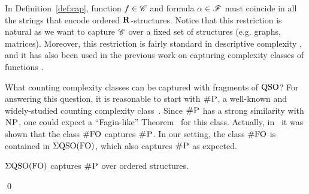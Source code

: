 In Definition~\ref{def:cap}, function $f \in \mathscr{C}$ and formula $\alpha \in \mathscr{F}$ must coincide in all the strings that encode ordered $\mathbf{R}$-structures. Notice that this restriction is natural as we want to capture %
$\mathscr{C}$ over a fixed set of structures (e.g. graphs, matrices).
Moreover, this restriction is fairly standard in descriptive complexity \cite{immerman1999descriptive,L04}, and it has also been used in the previous work on capturing complexity classes of functions \cite{SalujaST95,ComptonG96}.

What counting complexity classes can be captured with fragments of ${\rm QSO}$?
For answering this question, it is reasonable to start with $\text{\sc \#P}$, a well-known and widely-studied counting complexity class~\cite{arora2009computational}. 
Since $\text{\sc \#P}$ has a strong similarity with $\text{\sc NP}$, one could expect a ``Fagin-like'' Theorem~\cite{F75} for this class. 
Actually, in~\cite{SalujaST95} it was shown that the class $\#{\rm FO}$ captures $\text{\sc \#P}$.
In our setting, the class $\#{\rm FO}$ is contained in $\Sigma{\rm QSO}({\rm FO})$, which also captures $\text{\sc \#P}$ as expected.
 
\begin{prop} \label{prop:capture-shP}
	$\Sigma{\rm QSO}({\rm FO})$ captures $\text{\sc \#P}$ over ordered structures.
\end{prop}
\proof
 
\qed

